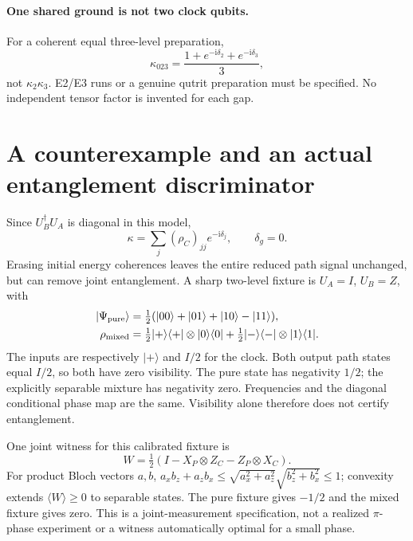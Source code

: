 \documentclass[11pt,a4paper]{article}
\newcommand{\ii}{\mathrm i}
\begin{document}
\paragraph{One shared ground is not two clock qubits.}
For a coherent equal three-level preparation,
\begin{equation}
 \kappa_{023}=\frac{1+e^{-\ii\delta_2}+e^{-\ii\delta_3}}3,
\end{equation}
not $\kappa_2\kappa_3$. E2/E3 runs or a genuine qutrit preparation must
be specified. No independent tensor factor is invented for each gap.

\newpage
\section{A counterexample and an actual entanglement discriminator}
Since $U_B^\dagger U_A$ is diagonal in this model,
\begin{equation}
 \kappa=\sum_j(\rho_C)_{jj}e^{-\ii\delta_j},\qquad\delta_g=0.
\end{equation}
Erasing initial energy coherences leaves the entire reduced path signal
unchanged, but can remove joint entanglement. A sharp two-level fixture is
$U_A=I$, $U_B=Z$, with
\begin{align}
 |\Psi_{\rm pure}\rangle
 &=\tfrac12(|00\rangle+|01\rangle+|10\rangle-|11\rangle),\\
 \rho_{\rm mixed}
 &=\tfrac12|+\rangle\langle+|\otimes|0\rangle\langle0|
   +\tfrac12|-\rangle\langle-|\otimes|1\rangle\langle1| .
\end{align}
The inputs are respectively $|+\rangle$ and $I/2$ for the clock.
Both output path states equal $I/2$, so both have zero visibility.
The pure state has negativity $1/2$; the explicitly separable mixture
has negativity zero. Frequencies and the diagonal conditional phase
map are the same. Visibility alone therefore does not certify entanglement.

One joint witness for this calibrated fixture is
\begin{equation}
 W=\tfrac12(I-X_P\otimes Z_C-Z_P\otimes X_C).
\end{equation}
For product Bloch vectors $a,b$,
$a_xb_z+a_zb_x\leq\sqrt{a_x^2+a_z^2}\sqrt{b_z^2+b_x^2}\leq1$;
convexity extends $\langle W\rangle\geq0$ to separable states.
The pure fixture gives $-1/2$ and the mixed fixture gives zero.
This is a joint-measurement specification, not a realized $\pi$-phase
experiment or a witness automatically optimal for a small phase.
\end{document}
